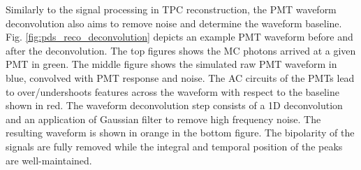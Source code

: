 Similarly to the signal processing in TPC reconstruction, the PMT waveform deconvolution also aims to remove noise and determine the waveform baseline.
Fig. \ref{fig:pds_reco_deconvolution} \cite{} depicts an example PMT waveform before and after the deconvolution.
The top figures shows the MC photons arrived at a given PMT in green.
The middle figure shows the simulated raw PMT waveform in blue, convolved with PMT response and noise.
The AC circuits of the PMTs lead to over/undershoots features across the waveform with respect to the baseline shown in red.
The waveform deconvolution step consists of a 1D deconvolution and an application of Gaussian filter to remove high frequency noise.
The resulting waveform is shown in orange in the bottom figure.
The bipolarity of the signals are fully removed while the integral and temporal position of the peaks are well-maintained.

